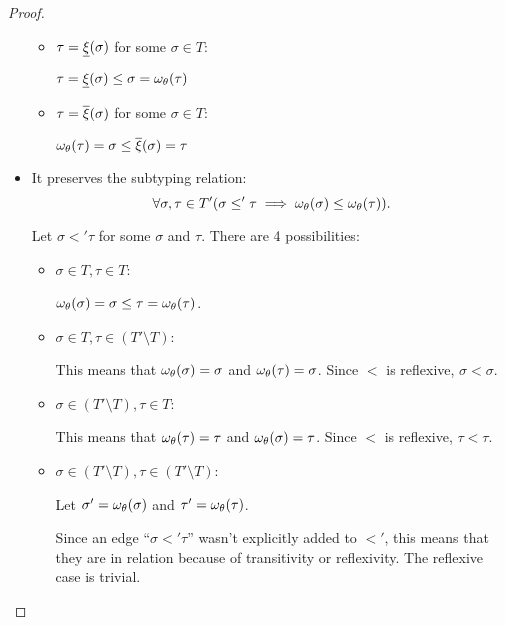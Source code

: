 \documentclass[main.tex]{subfiles}
\begin{document}
\begin{proof}
\begin{itemize}
\begin{itemize}
                \item $\tau = \underline{\xi}(\sigma)$ for some $\sigma \in T$:

                    $\tau = \underline{\xi}(\sigma) \leq \sigma = \omega_{\theta}(\tau)$

                \item $\tau = \overline{\xi}(\sigma)$ for some $\sigma \in T$:

                    $\omega_{\theta}(\tau) = \sigma \leq \overline{\xi}(\sigma) = \tau$
            \end{itemize}

        \item It preserves the subtyping relation:
            \[ \forall \sigma, \tau \in T' (\sigma \leq' \tau \implies
                \omega_{\theta}(\sigma) \leq \omega_{\theta}(\tau)). \]

            Let $\sigma \less' \tau$ for some $\sigma$ and $\tau$.
            There are 4 possibilities:
            \begin{itemize}
                \item $\sigma \in T, \tau \in T$:

                    $\omega_{\theta}(\sigma) = \sigma \leq \tau = \omega_{\theta}(\tau)$.
                \item $\sigma \in T, \tau \in (T' \setminus T)$:

                    This means that $\omega_{\theta}(\sigma) = \sigma$
                    and $\omega_{\theta}(\tau) = \sigma$. Since $\less$ is
                    reflexive, $\sigma \less \sigma$.
                \item $\sigma \in (T' \setminus T), \tau \in T$:

                    This means that $\omega_{\theta}(\tau) = \tau$
                    and $\omega_{\theta}(\sigma) = \tau$. Since $\less$ is
                    reflexive, $\tau \less \tau$.
                \item $\sigma \in (T' \setminus T), \tau \in (T' \setminus T)$:

                    Let $\sigma' = \omega_{\theta}(\sigma)$
                    and $\tau' = \omega_{\theta}(\tau)$.

                    Since an edge ``$\sigma \less' \tau$''
                    wasn't explicitly added to $\less'$, this means that they
                    are in relation because of transitivity or reflexivity.
                    The reflexive case is trivial.


\end{itemize}
\end{itemize}
\end{proof}
\end{document}
